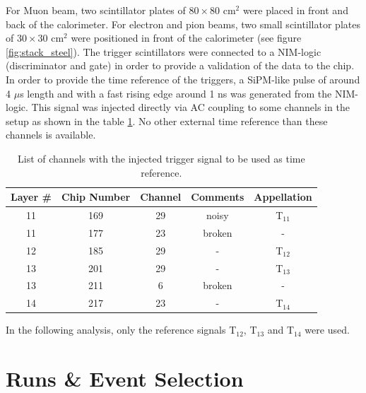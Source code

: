 \documentclass[twoside,a4paper,11pt]{article}
\begin{document}
For Muon beam, two scintillator plates of $80\times80$ cm$^2$ were placed in front and back of the calorimeter. For electron and pion beams, two small scintillator plates of $30\times30$ cm$^2$ were positioned in front of the calorimeter (see figure \ref{fig:stack_steel}). The trigger scintillators were connected to a NIM-logic (discriminator and gate) in order to provide a validation of the data to the chip. 
In order to provide the time reference of the triggers, a SiPM-like pulse of around 4 $\mu$s length and with a fast rising edge around 1 ns was generated from the NIM-logic. This signal was injected directly via AC coupling to some channels in the setup as shown in the table \ref{table:trigger_signal_list}. No other external time reference than these channels is available.
\begin{table}[htbp]
\centering
  \begin{tabular}{@{} ccccc @{}}
    \hline
    Layer \# & Chip Number & Channel & Comments & Appellation \\ 
    \hline
    11 & 169 & 29 & noisy & T$_{11}$ \\ 
    11 & 177 & 23 & broken & - \\
    12 & 185 & 29 & - & T$_{12}$ \\ 
    13 & 201 & 29 & -  & T$_{13}$ \\
    13 & 211 & 6 & broken & - \\ 
    14 & 217 & 23 & - & T$_{14}$ \\
    \hline
  \end{tabular}
  \caption{List of channels with the injected trigger signal to be used as time reference.}
  \label{table:trigger_signal_list}
\end{table}
In the following analysis, only the reference signals T$_{12}$,  T$_{13}$ and T$_{14}$ were used.

\section{Runs \& Event Selection}
\end{document}
